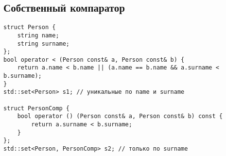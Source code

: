 \subsection{Собственный компаратор}
\begin{verbatim}
struct Person {
    string name;
	string surname;
};
bool operator < (Person const& a, Person const& b) {
    return a.name < b.name || (a.name == b.name && a.surname < b.surname);
}
std::set<Person> s1; // уникальные по name и surname

struct PersonComp {
	bool operator () (Person const& a, Person const& b) const {
	    return a.surname < b.surname;
	}
};
std::set<Person, PersonComp> s2; // только по surname
\end{verbatim}
